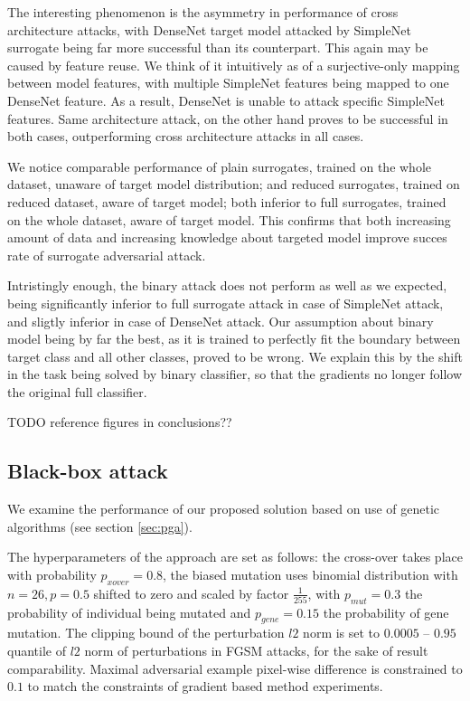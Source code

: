 The interesting phenomenon is the asymmetry in performance of cross architecture attacks, with DenseNet target model attacked by SimpleNet surrogate being far more successful than its counterpart. This again may be caused by feature reuse. We think of it intuitively as of a surjective-only mapping between model features, with multiple SimpleNet features being mapped to one DenseNet feature. As a result, DenseNet is unable to attack specific SimpleNet features. Same architecture attack, on the other hand proves to be successful in both cases, outperforming cross architecture attacks in all cases.

We notice comparable performance of plain surrogates, trained on the whole dataset, unaware of target model distribution; and reduced surrogates, trained on reduced dataset, aware of target model; both inferior to full surrogates, trained on the whole dataset, aware of target model. This confirms that both increasing amount of data and increasing knowledge about targeted model improve succes rate of surrogate adversarial attack.

Intristingly enough, the binary attack does not perform as well as we expected, being significantly inferior to full surrogate attack in case of SimpleNet attack, and sligtly inferior in case of DenseNet attack. Our assumption about binary model being by far the best, as it is trained to perfectly fit the boundary between target class and all other classes, proved to be wrong. We explain this by the shift in the task being solved by binary classifier, so that the gradients no longer follow the original full classifier.

TODO reference figures in conclusions??

\subsection{Black-box attack}
\label{sec:blackbox_ga}
We examine the performance of our proposed solution based on use of genetic algorithms (see section \ref{sec:pga}).

The hyperparameters of the approach are set as follows: the cross-over takes place with probability $p_{xover} = 0.8$, the biased mutation uses binomial distribution with $n = 26, p = 0.5$ shifted to zero and scaled by factor $\frac{1}{255}$, with $p_{mut} = 0.3$ the probability of individual being mutated and $p_{gene} = 0.15$ the probability of gene mutation. The clipping bound of the perturbation $l2$ norm is set to $0.0005$ -- $0.95$ quantile of $l2$ norm of perturbations in FGSM attacks, for the sake of result comparability. Maximal adversarial example pixel-wise difference is constrained to $0.1$ to match the constraints of gradient based method experiments.

